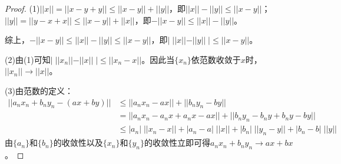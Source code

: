 \begin{proof}
	(1)$||x||=||x-y+y||\leqslant||x-y||+||y||$，即$||x||-||y||\leqslant||x-y||$；$||y||=||y-x+x||\leqslant||x-y||+||x||$，即$-||x-y||\leqslant||x||-||y||$。\par
	综上，$-||x-y||\leqslant||x||-||y||\leqslant||x-y||$，即$|\;||x||-||y||\;|\leqslant||x-y||$。\par
	(2)由(1)可知$|\;||x_n||-||x||\;|\leqslant||x_n-x||$。因此当$\{x_n\}$依范数收敛于$x$时，$||x_n||\to||x||$。\par
	(3)由范数的定义：
	\begin{align*}
		||a_nx_n+b_ny_n-(ax+by)||
		&\leqslant||a_nx_n-ax||+||b_ny_n-by|| \\
		&=||a_nx_n-a_nx+a_nx-ax||+||b_ny_n-b_ny+b_ny-by|| \\
		&\leqslant|a_n|\;||x_n-x||+|a_n-a|\;||x||+|b_n|\;||y_n-y||+|b_n-b|\;||y||
	\end{align*}
	由$\{a_n\}$和$\{b_n\}$的收敛性以及$\{x_n\}$和$\{y_n\}$的收敛性立即可得$a_nx_n+b_ny_n\to ax+bx$。
\end{proof}
